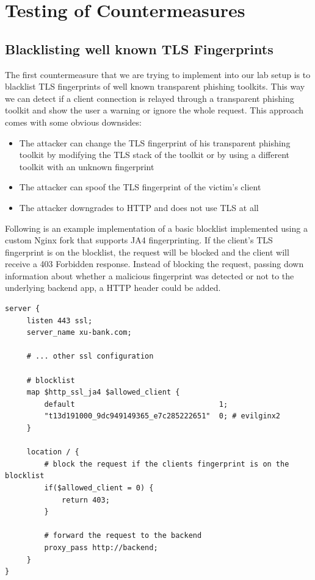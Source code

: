 \documentclass[12pt]{scrbook}
\begin{document}
\newpage \section{Testing of Countermeasures} \subsection{Blacklisting well
	known TLS Fingerprints} The first countermeasure that we are trying to
implement
into our lab setup is to blacklist TLS fingerprints of well known
transparent phishing toolkits. This way we can detect if a client connection is
relayed through a transparent phishing toolkit and show the user a warning or
ignore the whole request. This approach comes with some obvious downsides:

\begin{itemize}
	\item The attacker can change the TLS fingerprint of his
	      transparent phishing toolkit by modifying the TLS stack of the toolkit or
	      by
	      using a different toolkit with an unknown fingerprint
	\item The attacker can spoof the TLS fingerprint of the victim's client
	\item The attacker downgrades to HTTP and does not use TLS at all
\end{itemize}

Following is an example implementation of a basic blocklist implemented using a
custom Nginx
fork that supports JA4 fingerprinting. If the client's TLS fingerprint is on the
blocklist, the request will be blocked and the client will receive a 403
Forbidden response. Instead of blocking the request, passing down information
about whether a malicious fingerprint was detected or not to the underlying
backend app, a HTTP header could be added.

\begin{verbatim}
server {
     listen 443 ssl;
     server_name xu-bank.com;

     # ... other ssl configuration

     # blocklist
     map $http_ssl_ja4 $allowed_client {
         default                                 1;
         "t13d191000_9dc949149365_e7c285222651"  0; # evilginx2
     }

     location / {
         # block the request if the clients fingerprint is on the blocklist
         if($allowed_client = 0) {
             return 403;
         }

         # forward the request to the backend
         proxy_pass http://backend;
     }
}
\end{verbatim}
\end{document}
